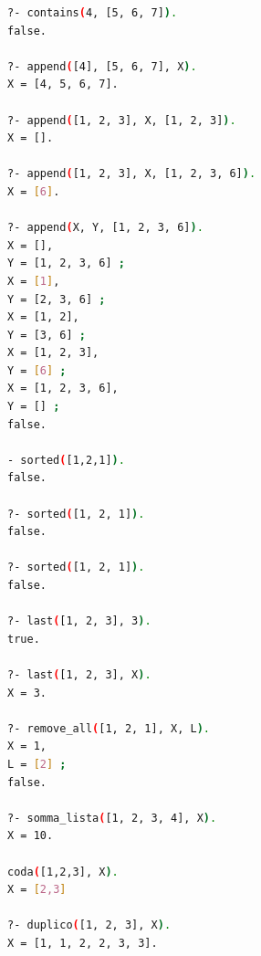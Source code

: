 \documentclass[a4paper,12pt, oneside]{book}
\begin{document}
\begin{esercizio}
\begin{shaded}
\begin{lstlisting}[language=bash]
?- contains(4, [5, 6, 7]).
false.

?- append([4], [5, 6, 7], X).
X = [4, 5, 6, 7].

?- append([1, 2, 3], X, [1, 2, 3]).
X = [].

?- append([1, 2, 3], X, [1, 2, 3, 6]).
X = [6].

?- append(X, Y, [1, 2, 3, 6]).
X = [],
Y = [1, 2, 3, 6] ;
X = [1],
Y = [2, 3, 6] ;
X = [1, 2],
Y = [3, 6] ;
X = [1, 2, 3],
Y = [6] ;
X = [1, 2, 3, 6],
Y = [] ;
false.

- sorted([1,2,1]).
false.

?- sorted([1, 2, 1]).
false.

?- sorted([1, 2, 1]).
false.

?- last([1, 2, 3], 3).
true.

?- last([1, 2, 3], X).
X = 3.

?- remove_all([1, 2, 1], X, L).
X = 1,
L = [2] ;
false.

?- somma_lista([1, 2, 3, 4], X).
X = 10.

coda([1,2,3], X).
X = [2,3]

?- duplico([1, 2, 3], X).
X = [1, 1, 2, 2, 3, 3].

\end{lstlisting}
\end{shaded}
\end{esercizio}
\end{document}

